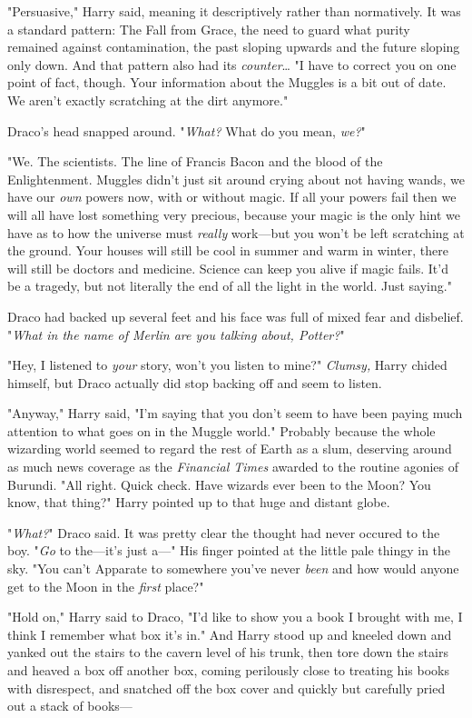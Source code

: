 "Persuasive," Harry said, meaning it descriptively rather than normatively. It 
was a standard pattern: The Fall from Grace, the need to guard what purity 
remained against contamination, the past sloping upwards and the future sloping 
only down. And that pattern also had its \emph{counter}{\ldots} "I have to 
correct you on one point of fact, though. Your information about the Muggles is 
a bit out of date. We aren't exactly scratching at the dirt anymore."

Draco's head snapped around. "\emph{What?} What do you mean, \emph{we?}"

"We. The scientists. The line of Francis Bacon and the blood of the 
Enlightenment. Muggles didn't just sit around crying about not having wands, we 
have our \emph{own} powers now, with or without magic. If all your powers fail 
then we will all have lost something very precious, because your magic is the 
only hint we have as to how the universe must \emph{really} work---but you 
won't be left scratching at the ground. Your houses will still be cool in 
summer and warm in winter, there will still be doctors and medicine. Science 
can keep you alive if magic fails. It'd be a tragedy, but not literally the end 
of all the light in the world. Just saying."

Draco had backed up several feet and his face was full of mixed fear and 
disbelief. "\emph{What in the name of Merlin are you talking about, Potter?}"

"Hey, I listened to \emph{your} story, won't you listen to mine?" 
\emph{Clumsy,} Harry chided himself, but Draco actually did stop backing off 
and seem to listen.

"Anyway," Harry said, "I'm saying that you don't seem to have been paying much 
attention to what goes on in the Muggle world." Probably because the whole 
wizarding world seemed to regard the rest of Earth as a slum, deserving around 
as much news coverage as the \emph{Financial Times} awarded to the routine 
agonies of Burundi. "All right. Quick check. Have wizards ever been to the 
Moon? You know, that thing?" Harry pointed up to that huge and distant globe.

"\emph{What?}" Draco said. It was pretty clear the thought had never occured to 
the boy. "\emph{Go} to the---it's just a---" His finger pointed at the little 
pale thingy in the sky. "You can't Apparate to somewhere you've never 
\emph{been} and how would anyone get to the Moon in the \emph{first} place?"

"Hold on," Harry said to Draco, "I'd like to show you a book I brought with me, 
I think I remember what box it's in." And Harry stood up and kneeled down and 
yanked out the stairs to the cavern level of his trunk, then tore down the 
stairs and heaved a box off another box, coming perilously close to treating 
his books with disrespect, and snatched off the box cover and quickly but 
carefully pried out a stack of books---

